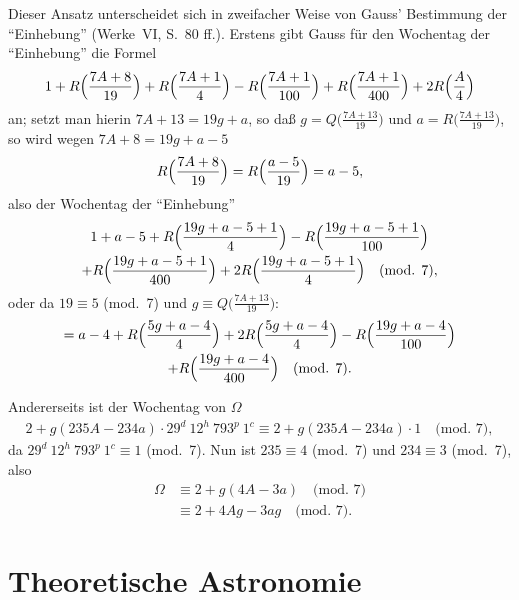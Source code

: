 \documentclass[12pt,a4paper]{article}
\theoremstyle{plain}
\theoremstyle{definition}
\theoremstyle{remark}
\begin{document}
Dieser Ansatz unterscheidet sich in zweifacher Weise von Gauss' Bestimmung der ``Einhebung'' (Werke~VI, S.~80 ff.). Erstens gibt Gauss für den Wochentag der ``Einhebung'' die Formel
\begin{equation}
1 + R\Bigl(\frac{7A + 8}{19}\Bigr) + R\Bigl(\frac{7A + 1}{4}\Bigr) - R\Bigl(\frac{7A + 1}{100}\Bigr) + R\Bigl(\frac{7A + 1}{400}\Bigr) + 2R\Bigl(\frac{A}{4}\Bigr)
\end{equation}
an; setzt man hierin $7A + 13 = 19g + a$, so daß $g = Q\bigl(\frac{7A + 13}{19}\bigr)$ und $a = R\bigl(\frac{7A + 13}{19}\bigr)$, so wird wegen $7A + 8 = 19g + a - 5$
\[
R\Bigl(\frac{7A + 8}{19}\Bigr) = R\Bigl(\frac{a - 5}{19}\Bigr) = a - 5,
\]
also der Wochentag der ``Einhebung''
\begin{multline*}
1 + a - 5 + R\Bigl(\frac{19g + a - 5 + 1}{4}\Bigr) - R\Bigl(\frac{19g + a - 5 + 1}{100}\Bigr) \\
+ R\Bigl(\frac{19g + a - 5 + 1}{400}\Bigr) + 2R\Bigl(\frac{19g + a - 5 + 1}{4}\Bigr) \quad \text{(mod. 7)},
\end{multline*}
oder da $19 \equiv 5$ (mod.~7) und $g \equiv Q\bigl(\frac{7A + 13}{19}\bigr)$:
\begin{multline*}
= a - 4 + R\Bigl(\frac{5g + a - 4}{4}\Bigr) + 2R\Bigl(\frac{5g + a - 4}{4}\Bigr) - R\Bigl(\frac{19g + a - 4}{100}\Bigr) \\
+ R\Bigl(\frac{19g + a - 4}{400}\Bigr) \quad \text{(mod. 7)}.
\end{multline*}

Andererseits ist der Wochentag von $\Omega$
\begin{multline*}
2 + g(235A - 234a) \cdot 29^d\ 12^h\ 793^p\ 1^c \equiv 2 + g(235A - 234a) \cdot 1 \quad \text{(mod. 7)},
\end{multline*}
da $29^d\ 12^h\ 793^p\ 1^c \equiv 1$ (mod.~7). Nun ist $235 \equiv 4$ (mod.~7) und $234 \equiv 3$ (mod.~7), also
\begin{align*}
\Omega &\equiv 2 + g(4A - 3a) \quad \text{(mod. 7)} \\
&\equiv 2 + 4Ag - 3ag \quad \text{(mod. 7)}.
\end{align*}

\newpage

\section*{Theoretische Astronomie}
\end{document}
